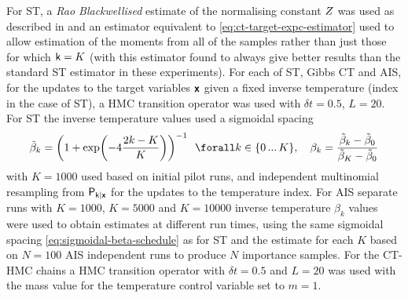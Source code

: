 For \ac{ST}, a \emph{Rao Blackwellised} estimate of the normalising constant $Z$ was used as described in \citep{carlson2016partition} and an estimator equivalent to \eqref{eq:ct-target-expc-estimator} used to allow estimation of the moments from all of the samples rather than just those for which $\mathsf{k}=K$ (with this estimator found to always give better results than the standard \ac{ST} estimator in these experiments). For each of \ac{ST}, Gibbs \ac{CT} and \ac{AIS}, for the updates to the target variables $\boldsymbol{\mathsf{x}}$ given a fixed inverse temperature (index in the case of \ac{ST}), a \ac{HMC} transition operator was used with $\delta t = 0.5$, $L = 20$. For \ac{ST} the inverse temperature values used a sigmoidal spacing
\begin{equation}\label{eq:sigmoidal-beta-schedule}
  \tilde{\beta}_k = \lpa 1 + \exp\lpa -4\frac{2k-K}{K}\rpa\rpa^{-1} ~~\forall k \in \lbrace 0\,...\,K \rbrace, \quad
  \beta_k = \frac{\tilde{\beta}_k - \tilde{\beta}_0}{\tilde{\beta}_K - \tilde{\beta}_0}
\end{equation}
with $K=1000$ used based on initial pilot runs, and independent multinomial resampling from $\mathsf{P}_{\mathsf{k}|\boldsymbol{\mathsf{x}}}$ for the updates to the temperature index. For \ac{AIS} separate runs with $K=1000$, $K=5000$ and $K=10000$ inverse temperature $\beta_k$ values were used to obtain estimates at different run times, using the same sigmoidal spacing \eqref{eq:sigmoidal-beta-schedule} as for \ac{ST} and the estimate for each $K$ based on $N=100$ \ac{AIS} independent runs to produce $N$ importance samples. For the \ac{CT-HMC} chains a \ac{HMC} transition operator with $\delta t=0.5$ and $L=20$ was used with the mass value for the temperature control variable set to $m=1$.

